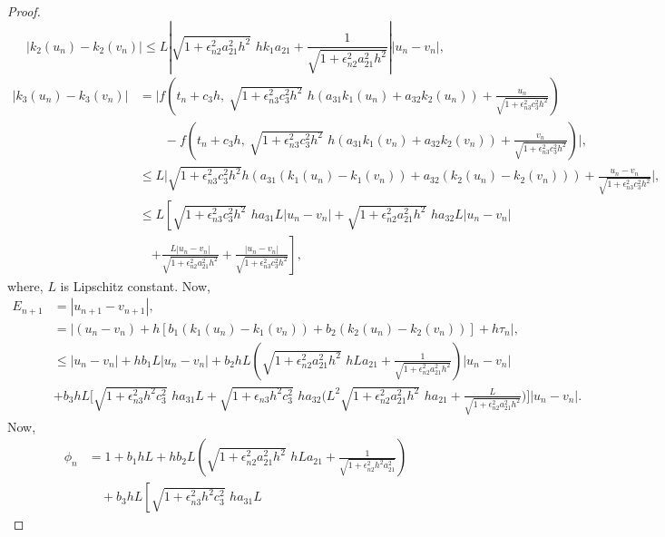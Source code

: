 \documentclass[10pt,a4paper]{amsart}
\begin{document}
\begin{proof}
\begin{equation*}
     |k_2(u_n) - k_2(v_n)|\leq L\left|\sqrt{1 + \epsilon_{n2}^2a_{21}^2h^2}\,\,hk_1a_{21} +\frac{1}{\sqrt{1 +\epsilon_{n2}^2a_{21}^2h^2}}\right||u_n - v_n|,
 \end{equation*}
 \begin{align*}
|k_3(u_n) - k_3(v_n)| 
&= \Bigg| 
f\left(t_n + c_3 h,\ \sqrt{1 + \epsilon_{n3}^2 c_3^2 h^2} \,\, h (a_{31} k_1(u_n) + a_{32} k_2(u_n)) 
+ \frac{u_n}{\sqrt{1 + \epsilon_{n3}^2 c_3^2 h^2}} \right) \\
&\qquad - 
f\left(t_n + c_3 h,\ \sqrt{1 + \epsilon_{n3}^2 c_3^2 h^2} \,\,  h (a_{31} k_1(v_n) + a_{32} k_2(v_n)) 
+ \frac{v_n}{\sqrt{1 + \epsilon_{n3}^2 c_3^2 h^2}} \right)
\Bigg|, \\
&\leq L \Bigg| 
\sqrt{1 + \epsilon_{n3}^2 c_3^2 h^2}  h \left( a_{31}(k_1(u_n) - k_1(v_n)) 
+ a_{32}(k_2(u_n) - k_2(v_n)) \right) 
+ \frac{u_n - v_n}{\sqrt{1 + \epsilon_{n3}^2 c_3^2 h^2}} 
\Bigg|, \\
&\leq L \left[ 
\sqrt{1 + \epsilon_{n3}^2 c_3^2 h^2} \,\, h a_{31} L |u_n - v_n| 
+ \sqrt{1 + \epsilon_{n2}^2 a_{21}^2 h^2} \,\,  h a_{32} L |u_n - v_n| \right. \\
&\quad \left. +  \frac{L|u_n - v_n|}{\sqrt{1 + \epsilon_{n2}^2 a_{21}^2 h^2}}
+ \frac{|u_n - v_n|}{\sqrt{1 + \epsilon_{n3}^2 c_3^2 h^2}} 
\right],
\end{align*}
where, $L$ is Lipschitz constant. 
Now,
\begin{align*}
    E_{n+1} & = |u_{n+1} - v_{n+1}|, \\
& = |(u_n - v_n) + h \left[ b_1(k_1(u_n) - k_1(v_n)) + b_2(k_2(u_n) - k_2(v_n))\right ] + h\tau_n|, \\
& \leq |u_n - v_n| + hb_1L|u_n - v_n| + b_2hL\left(\sqrt{1 + \epsilon_{n2}^2a_{21}^2h^2}\,\,hLa_{21} +  \frac{1}{\sqrt{1 +\epsilon_{n2}^2a_{21}^2h^2}}\right)|u_n - v_n| \\
& + b_3hL \Biggr[ \sqrt{1 + \epsilon_{n3}^2h^2c_3^2}\,\,ha_{31}L  + \sqrt{1+\epsilon_{n3}h^2c_3^2}\,\,ha_{32} \Biggr(L^2\sqrt{1 + \epsilon_{n2}^2a_{21}^2h^2}\,\,ha_{21} + \frac{L}{\sqrt{1 + \epsilon_{n2}^2a_{21}^2h^2}}\Biggl)\Biggr]|u_n - v_n|. 
\end{align*}
Now,
\begin{align*}
    \phi_n &= 1 + b_1 h L 
    + h b_2 L \left( \sqrt{1 + \epsilon_{n2}^2 a_{21}^2 h^2}\,\, h L a_{21} + \frac{1}{\sqrt{1 + \epsilon_{n2}^2 h^2 a_{21}^2}} \right) \\
    &\quad + b_3 h L \left[ \sqrt{1 + \epsilon_{n3}^2 h^2 c_3^2}\,\, h a_{31} L 

\end{align*}
\end{proof}
\end{document}
